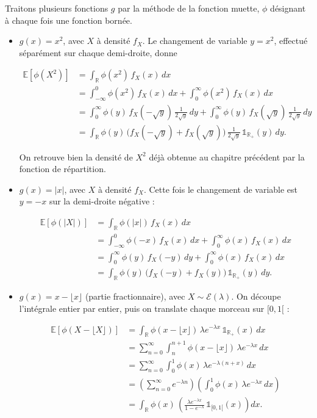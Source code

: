 \begin{exemple}
Traitons plusieurs fonctions $g$ par la méthode de la fonction muette, $\phi$ désignant à chaque fois une fonction bornée.

\begin{itemize}
\item $g(x) = x^2$, avec $X$ à densité $f_X$. Le changement de variable $y = x^2$, effectué séparément sur chaque demi-droite, donne

\begin{align*}
\mathbb{E}[\phi(X^2)] &= \int_{\mathbb{R}} \phi(x^2)\, f_X(x)\, dx \\
&= \int_{-\infty}^0 \phi(x^2)\, f_X(x)\, dx + \int_0^\infty \phi(x^2)\, f_X(x)\, dx \\
&= \int_0^\infty \phi(y)\, f_X(-\sqrt{y})\, \frac{1}{2\sqrt{y}}\, dy + \int_0^\infty \phi(y)\, f_X(\sqrt{y})\, \frac{1}{2\sqrt{y}}\, dy \\
&= \int_{\mathbb{R}} \phi(y)\, \big(f_X(-\sqrt{y}) + f_X(\sqrt{y})\big)\, \frac{1}{2\sqrt{y}}\, \mathbb{1}_{\mathbb{R}_+}(y)\, dy.
\end{align*}

On retrouve bien la densité de $X^2$ déjà obtenue au chapitre précédent par la fonction de répartition.

\item $g(x) = |x|$, avec $X$ à densité $f_X$. Cette fois le changement de variable est $y = -x$ sur la demi-droite négative :

\begin{align*}
\mathbb{E}[\phi(|X|)] &= \int_{\mathbb{R}} \phi(|x|)\, f_X(x)\, dx \\
&= \int_{-\infty}^0 \phi(-x)\, f_X(x)\, dx + \int_0^\infty \phi(x)\, f_X(x)\, dx \\
&= \int_0^\infty \phi(y)\, f_X(-y)\, dy + \int_0^\infty \phi(x)\, f_X(x)\, dx \\
&= \int_{\mathbb{R}} \phi(y)\, \big(f_X(-y) + f_X(y)\big)\, \mathbb{1}_{\mathbb{R}_+}(y)\, dy.
\end{align*}

\item $g(x) = x - \lfloor x \rfloor$ (partie fractionnaire), avec $X \sim \mathcal{E}(\lambda)$. On découpe l'intégrale entier par entier, puis on translate chaque morceau sur $[0, 1[$ :

\begin{align*}
\mathbb{E}[\phi(X - \lfloor X \rfloor)] &= \int_{\mathbb{R}} \phi(x - \lfloor x \rfloor)\, \lambda e^{-\lambda x}\, \mathbb{1}_{\mathbb{R}_+}(x)\, dx \\
&= \sum_{n=0}^\infty \int_n^{n+1} \phi(x - \lfloor x \rfloor)\, \lambda e^{-\lambda x}\, dx \\
&= \sum_{n=0}^\infty \int_0^1 \phi(x)\, \lambda e^{-\lambda(n+x)}\, dx \\
&= \left( \sum_{n=0}^\infty e^{-\lambda n} \right) \left( \int_0^1 \phi(x)\, \lambda e^{-\lambda x}\, dx \right) \\
&= \int_{\mathbb{R}} \phi(x)\, \left( \frac{\lambda e^{-\lambda x}}{1 - e^{-\lambda}}\, \mathbb{1}_{[0,1[}(x) \right) dx.
\end{align*}


\end{itemize}
\end{exemple}
